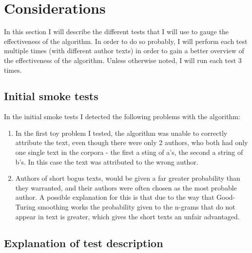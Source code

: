 \section{Considerations}
\label{considerations}

In this section I will describe the different tests that I will use to gauge the effectiveness of the algorithm. In order to do so probably, I will perform each test multiple times (with different author texts) in order to gain a better overview of the effectiveness of the algorithm. Unless otherwise noted, I  will run each test 3 times.

\subsection{Initial smoke tests}
\label{smokeTest}
In the initial smoke tests I detected the following problems with the algorithm:
\begin{enumerate}
\item In the first toy problem I tested, the algorithm was unable to correctly attribute the text, even though there were only 2 authors, who both had only one single text in the corpora - the first a sting of a's, the second a string of b's. In this case the text was attributed to the wrong author.

\item Authors of short bogus texts, would be given a far greater probability than they warranted, and their authors were often chosen as the most probable author. A possible explanation for this is that due to the way that Good-Turing smoothing works the probability given to the n-grams that do not appear in text is greater, which gives the short texts an unfair advantaged. 
\end{enumerate}
 

\subsection{Explanation of test description}

